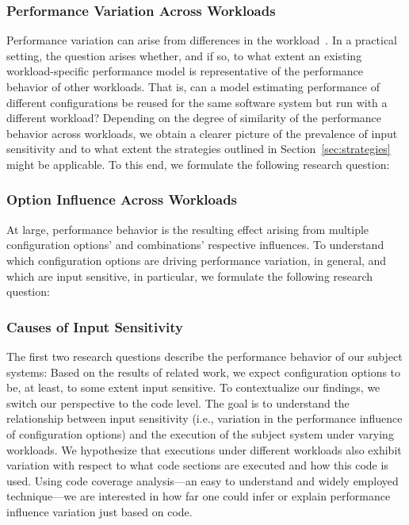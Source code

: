 {\subsubsection{Performance Variation Across Workloads}
Performance variation can arise from differences in the workload~\cite{benchmarking_book}. In a practical setting, the question arises whether, and if so, to what extent an existing workload-specific performance model is representative of the performance behavior of other workloads. 
That is, can a model estimating performance of different configurations be reused for the same software system but run with a different workload? Depending on the degree of similarity of the performance behavior across workloads, we obtain a clearer picture of the prevalence of input sensitivity and to what extent the strategies outlined in  Section~\ref{sec:strategies} might be applicable.
To this end, we formulate the following research question: 

\subsubsection{Option Influence Across Workloads}
At large, performance behavior is the resulting effect arising from multiple configuration options’ and combinations’ respective influences. To understand which configuration options are driving performance variation, in general, and which are input sensitive, in particular, we formulate the following research question:

\subsubsection{Causes of Input Sensitivity}
The first two research questions describe the performance behavior of our subject systems: Based on the results of related work, we expect configuration options to be, at least, to some extent input sensitive. To contextualize our findings, we switch our perspective to the code level. The goal is to understand the relationship between input sensitivity (i.e., variation in the performance influence of configuration options) and the execution of the subject system under varying workloads. We hypothesize that executions under different workloads also exhibit variation with respect to what code sections are executed and how this code is used. Using code coverage analysis---an easy to understand and widely employed technique---we are interested in how far one could infer or explain performance influence variation just based on code. 

}
